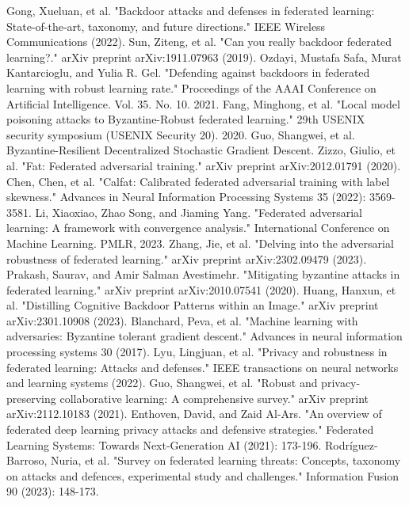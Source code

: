 \documentclass[conference]{IEEEtran}
\begin{document}
\begin{thebibliography}{00}
     Gong, Xueluan, et al. "Backdoor attacks and defenses in federated learning: State-of-the-art, taxonomy, and future directions." IEEE Wireless Communications (2022).
     Sun, Ziteng, et al. "Can you really backdoor federated learning?." arXiv preprint arXiv:1911.07963 (2019).
     Ozdayi, Mustafa Safa, Murat Kantarcioglu, and Yulia R. Gel. "Defending against backdoors in federated learning with robust learning rate." Proceedings of the AAAI Conference on Artificial Intelligence. Vol. 35. No. 10. 2021.
     Fang, Minghong, et al. "Local model poisoning attacks to {Byzantine-Robust} federated learning." 29th USENIX security symposium (USENIX Security 20). 2020.
     Guo, Shangwei, et al. Byzantine-Resilient Decentralized Stochastic Gradient Descent.
     Zizzo, Giulio, et al. "Fat: Federated adversarial training." arXiv preprint arXiv:2012.01791 (2020).
     Chen, Chen, et al. "Calfat: Calibrated federated adversarial training with label skewness." Advances in Neural Information Processing Systems 35 (2022): 3569-3581.
     Li, Xiaoxiao, Zhao Song, and Jiaming Yang. "Federated adversarial learning: A framework with convergence analysis." International Conference on Machine Learning. PMLR, 2023.
     Zhang, Jie, et al. "Delving into the adversarial robustness of federated learning." arXiv preprint arXiv:2302.09479 (2023).
     Prakash, Saurav, and Amir Salman Avestimehr. "Mitigating byzantine attacks in federated learning." arXiv preprint arXiv:2010.07541 (2020).
     Huang, Hanxun, et al. "Distilling Cognitive Backdoor Patterns within an Image." arXiv preprint arXiv:2301.10908 (2023).
     Blanchard, Peva, et al. "Machine learning with adversaries: Byzantine tolerant gradient descent." Advances in neural information processing systems 30 (2017).
     Lyu, Lingjuan, et al. "Privacy and robustness in federated learning: Attacks and defenses." IEEE transactions on neural networks and learning systems (2022).
     Guo, Shangwei, et al. "Robust and privacy-preserving collaborative learning: A comprehensive survey." arXiv preprint arXiv:2112.10183 (2021).
     Enthoven, David, and Zaid Al-Ars. "An overview of federated deep learning privacy attacks and defensive strategies." Federated Learning Systems: Towards Next-Generation AI (2021): 173-196.
     Rodríguez-Barroso, Nuria, et al. "Survey on federated learning threats: Concepts, taxonomy on attacks and defences, experimental study and challenges." Information Fusion 90 (2023): 148-173.

\end{thebibliography}
\end{document}
